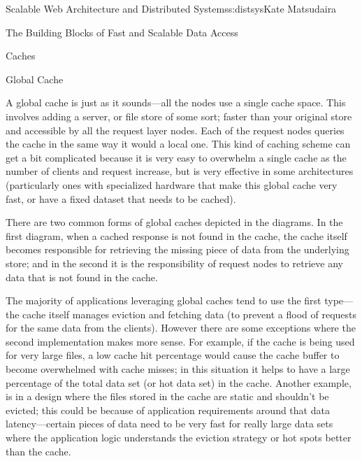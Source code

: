 \begin{aosachapter}{Scalable Web Architecture and Distributed Systems}{s:distsys}{Kate Matsudaira}
\begin{aosasect1}{The Building Blocks of Fast and Scalable Data Access}
\begin{aosasect2}{Caches}
\end{aosasect2}

\begin{aosasect2}{Global Cache}

A global cache is just as it sounds---all the nodes use a single cache
space. This involves adding a server, or file store of some sort;
faster than your original store and accessible by all the request
layer nodes. Each of the request nodes queries the cache in the same
way it would a local one. This kind of caching scheme can get a bit
complicated because it is very easy to overwhelm a single cache as the
number of clients and request increase, but is very effective in some
architectures (particularly ones with specialized hardware that make
this global cache very fast, or have a fixed dataset that needs to be
cached).



There are two common forms of global caches depicted in the
diagrams. In the first diagram, when a cached response is not found in
the cache, the cache itself becomes responsible for retrieving the
missing piece of data from the underlying store; and in the second it
is the responsibility of request nodes to retrieve any data that is
not found in the cache.

The majority of applications leveraging global caches tend to use the
first type---the cache itself manages eviction and fetching data (to
prevent a flood of requests for the same data from the
clients). However there are some exceptions where the second
implementation makes more sense. For example, if the cache is being
used for very large files, a low cache hit percentage would cause the
cache buffer to become overwhelmed with cache misses; in this
situation it helps to have a large percentage of the total data set
(or hot data set) in the cache. Another example, is in a design where
the files stored in the cache are static and shouldn’t be evicted;
this could be because of application requirements around that data
latency---certain pieces of data need to be very fast for really large
data sets where the application logic understands the eviction
strategy or hot spots better than the cache.

\end{aosasect2}


\end{aosasect1}
\end{aosachapter}
